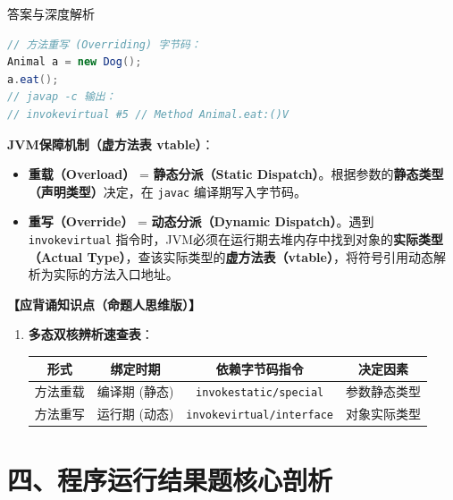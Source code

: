 \documentclass[12pt, a4paper]{ctexart}
\begin{document}
\begin{enumerate}[label=\textbf{\arabic*.}]
\begin{bluebox}{答案与深度解析}
\begin{itemize}[leftmargin=*]
\begin{itemize}[leftmargin=*, nosep]
\begin{lstlisting}[language=Java]
// 方法重写 (Overriding) 字节码：
Animal a = new Dog();
a.eat(); 
// javap -c 输出：
// invokevirtual #5 // Method Animal.eat:()V
\end{lstlisting}
				                  \textbf{JVM保障机制（虚方法表 vtable）}：
				                  \begin{itemize}
					                  \item \textbf{重载（Overload）} = \textbf{静态分派（Static Dispatch）}。根据参数的\textbf{静态类型（声明类型）}决定，在 \texttt{javac} 编译期写入字节码。
					                  \item \textbf{重写（Override）} = \textbf{动态分派（Dynamic Dispatch）}。遇到 \texttt{invokevirtual} 指令时，JVM必须在运行期去堆内存中找到对象的\textbf{实际类型（Actual Type）}，查该实际类型的\textbf{虚方法表（vtable）}，将符号引用动态解析为实际的方法入口地址。
				                  \end{itemize}
			            \end{itemize}
		      \end{itemize}

		      \textbf{【应背诵知识点（命题人思维版）】}
		      \begin{enumerate}[leftmargin=*, nosep]
			      \item \textbf{多态双核辨析速查表}：
			            \begin{tabular}{|c|c|c|c|}
				            \hline
				            \textbf{形式} & \textbf{绑定时期} & \textbf{依赖字节码指令}                 & \textbf{决定因素} \\
				            \hline
				            方法重载        & 编译期 (静态)      & \texttt{invokestatic/special}    & 参数静态类型        \\
				            \hline
				            方法重写        & 运行期 (动态)      & \texttt{invokevirtual/interface} & 对象实际类型        \\
				            \hline
			            \end{tabular}
		      \end{enumerate}
	      \end{bluebox}

\end{enumerate}

\newpage
\section{四、程序运行结果题核心剖析}
\end{document}
